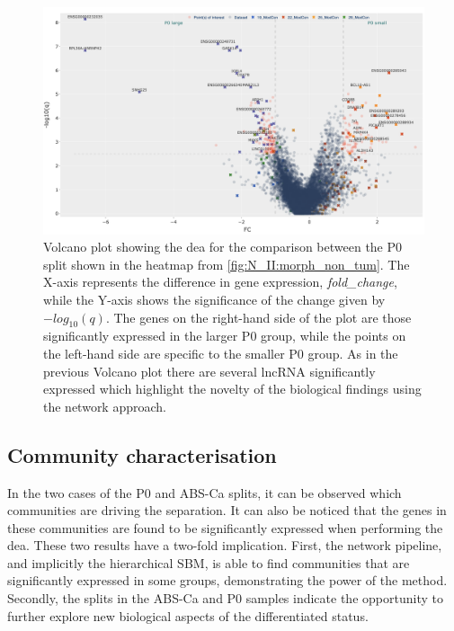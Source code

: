 \begin{figure}    
    \centering
    \includegraphics[width=1.0\textwidth,height=1.0\textheight,keepaspectratio]{Sections/Network_II/resources/non_tum/p0_split_dea.png}
    \caption[Volcano plot -  P0 splits comparison]{Volcano plot showing the \acrlong{dea} for the comparison between the P0 split shown in the heatmap from \cref{fig:N_II:morph_non_tum}. The X-axis represents the difference in gene expression, \textit{fold\_change}, while the Y-axis shows the significance of the change given by $-log_{10}(q)$. The genes on the right-hand side of the plot are those significantly expressed in the larger P0 group, while the points on the left-hand side are specific to the smaller P0 group. As in the previous Volcano plot there are several \acrshort{lncRNA} significantly expressed which highlight the novelty of the biological findings using the network approach.}
    \label{fig:N_II:p0_split}
\end{figure}

\subsection{Community characterisation} \label{s:N_II:comm_charact}

In the two cases of the P0 and ABS-Ca splits, it can be observed which communities are driving the separation. It can also be noticed that the genes in these communities are found to be significantly expressed when performing the \acrlong{dea}. These two results have a two-fold implication. First, the network pipeline, and implicitly the hierarchical SBM, is able to find communities that are significantly expressed in some groups, demonstrating the power of the method. Secondly, the splits in the ABS-Ca and P0 samples indicate the opportunity to further explore new biological aspects of the differentiated status.

